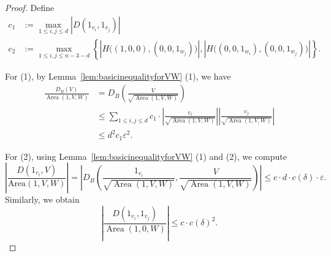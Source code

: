 \documentclass{compositio}
\numberwithin{equation}{section}
\numberwithin{figure}{section}
\theoremstyle{definition}
\theoremstyle{plain}
\begin{document}
{\begin{proof}
Define
\begin{align*}
c_1 &:= \max_{1\le i,j\le d} |D(1_{v_i},1_{v_j})|\\    
c_2 &:= \max_{1\le i,j\le n-3-d} \left\{|H\big((1,0,0),(0,0,1_{w_j})\big)|, |H\big((0,0,1_{w_i}),(0,0,1_{w_j})\big)|\right\}.
\end{align*}

For (1), by Lemma~\ref{lem:basicinequalityforVW} (1), we have
\begin{align*}
    \frac{D_B(V)}{\operatorname{Area}(1,V,W)}&=D_B\left(\frac{V}{\sqrt{\operatorname{Area}(1,V,W)}}\right)\\
    &\leq \sum_{1\leq i, j\leq d} c_1 \cdot \left|\frac{v_i}{\sqrt{\operatorname{Area}(1,V,W)}}\right| \left|\frac{v_j}{\sqrt{\operatorname{Area}(1,V,W)}}\right|\\
    &\leq d^2 c_1 \varepsilon^2.
\end{align*}

For (2), using Lemma~\ref{lem:basicinequalityforVW} (1) and (2), we compute
$$
\left|\frac{D(1_{v_i}, V)}{\mathrm{Area}(1,V,W)}\right| = 
\left|D_B\left(\frac{1_{v_i}}{\sqrt{\operatorname{Area}(1,V,W)}},\frac{V}{\sqrt{\operatorname{Area}(1,V,W)}}\right)\right|
\leq c \cdot d \cdot c(\delta) \cdot \varepsilon.
$$
Similarly, we obtain
$$
\left|\frac{D(1_{v_i},1_{v_j})}{\operatorname{Area}(1,0,W)}\right|\leq c \cdot c(\delta)^2.
$$


\end{proof}}
\end{document}
